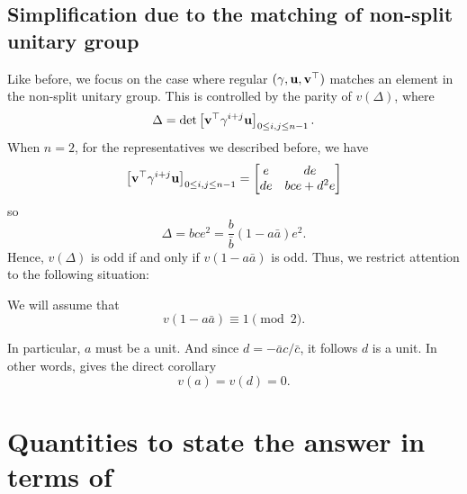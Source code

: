 \subsection{Simplification due to the matching of non-split unitary group}
Like before, we focus on the case where regular $(\gamma, \mathbf u, \mathbf v^\top)$
matches an element in the non-split unitary group.
This is controlled by the parity of $v(\Delta)$, where
\[ \Delta = \det \left[ \mathbf v^\top \gamma^{i+j} \mathbf u \right]_{0 \le i,j \le n-1}. \]
When $n=2$, for the representatives we described before,
we have
\[ \left[ \mathbf v^\top \gamma^{i+j} \mathbf u \right]_{0 \le i,j \le n-1}
  = \begin{bmatrix} e & de \\ de & bce + d^2e \end{bmatrix} \]
so
\[ \Delta = bce^2 = \frac{b}{\bar b}(1-a \bar a) e^2 . \]
Hence, $v(\Delta)$ is odd if and only if $v(1-a \bar a)$ is odd.
Thus, we restrict attention to the following situation:
\begin{assume}
  We will assume that
  \[ v(1-a \bar a) \equiv 1 \pmod 2. \]
  \label{assume:a_odd}
\end{assume}
In particular, $a$ must be a unit.
And since $d = -\bar a c / \bar c$, it follows $d$ is a unit.
In other words,  gives the direct corollary
\[ v(a) = v(d) = 0. \]

\section{Quantities to state the answer in terms of}
